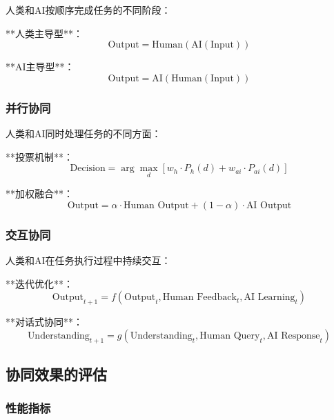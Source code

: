 人类和AI按顺序完成任务的不同阶段：

**人类主导型**：
\begin{equation}
\text{Output} = \text{Human}(\text{AI}(\text{Input}))
\end{equation}

**AI主导型**：
\begin{equation}
\text{Output} = \text{AI}(\text{Human}(\text{Input}))
\end{equation}

\subsubsection{并行协同}

人类和AI同时处理任务的不同方面：

**投票机制**：
\begin{equation}
\text{Decision} = \arg\max_d \left[ w_h \cdot P_h(d) + w_{ai} \cdot P_{ai}(d) \right]
\end{equation}

**加权融合**：
\begin{equation}
\text{Output} = \alpha \cdot \text{Human Output} + (1-\alpha) \cdot \text{AI Output}
\end{equation}

\subsubsection{交互协同}

人类和AI在任务执行过程中持续交互：

**迭代优化**：
\begin{equation}
\text{Output}_{t+1} = f(\text{Output}_t, \text{Human Feedback}_t, \text{AI Learning}_t)
\end{equation}

**对话式协同**：
\begin{equation}
\text{Understanding}_{t+1} = g(\text{Understanding}_t, \text{Human Query}_t, \text{AI Response}_t)
\end{equation}

\subsection{协同效果的评估}

\subsubsection{性能指标}


